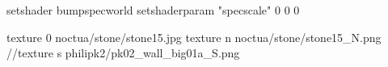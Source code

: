 setshader bumpspecworld
setshaderparam "specscale" 0 0 0

texture 0 noctua/stone/stone15.jpg
texture n noctua/stone/stone15_N.png
//texture s philipk2/pk02_wall_big01a_S.png
